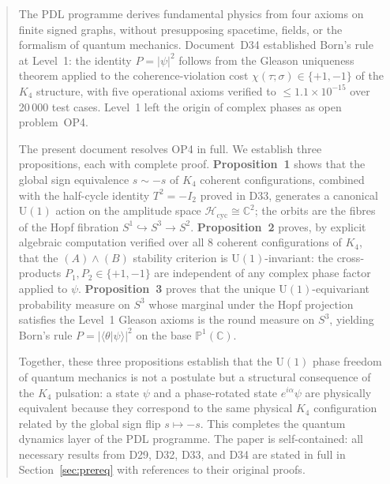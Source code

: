 \documentclass[12pt,a4paper]{article}
\newcommand{\CC}{\mathbb{C}}
\newcommand{\PP}{\mathbb{P}}
\begin{document}
\begin{abstract}
The PDL programme derives fundamental physics from four axioms on finite signed graphs,
without presupposing spacetime, fields, or the formalism of quantum mechanics.
Document~D34 established Born's rule at Level~1: the identity $P = |\psi|^2$ follows
from the Gleason uniqueness theorem applied to the coherence-violation cost $\chi(\tau;\sigma)
\in \{+1,-1\}$ of the $K_4$ structure, with five operational axioms verified to
$\leq 1.1\times10^{-15}$ over 20\,000 test cases. Level~1 left the origin of complex
phases as open problem~OP4.

The present document resolves OP4 in full. We establish three propositions, each with
complete proof. \textbf{Proposition~1} shows that the global sign equivalence
$s \sim -s$ of $K_4$ coherent configurations, combined with the half-cycle identity
$T^2 = -I_2$ proved in D33, generates a canonical $\mathrm{U}(1)$ action on the
amplitude space $\mathcal{H}_{\mathrm{cyc}} \cong \CC^2$; the orbits are the fibres of
the Hopf fibration $S^1 \hookrightarrow S^3 \to S^2$. \textbf{Proposition~2} proves,
by explicit algebraic computation verified over all 8 coherent configurations of $K_4$,
that the $(A)\wedge(B)$ stability criterion is $\mathrm{U}(1)$-invariant: the
cross-products $P_1, P_2 \in \{+1,-1\}$ are independent of any complex phase factor
applied to $\psi$. \textbf{Proposition~3} proves that the unique
$\mathrm{U}(1)$-equivariant probability measure on $S^3$ whose marginal under the Hopf
projection satisfies the Level~1 Gleason axioms is the round measure on $S^3$, yielding
Born's rule $P = |\langle\theta|\psi\rangle|^2$ on the base $\PP^1(\CC)$.

Together, these three propositions establish that the $\mathrm{U}(1)$ phase freedom of
quantum mechanics is not a postulate but a structural consequence of the $K_4$ pulsation:
a state $\psi$ and a phase-rotated state $e^{i\alpha}\psi$ are physically equivalent
because they correspond to the same physical $K_4$ configuration related by the global
sign flip $s \mapsto -s$. This completes the quantum dynamics layer of the PDL programme.
The paper is self-contained: all necessary results from D29, D32, D33, and D34 are stated
in full in Section~\ref{sec:prereq} with references to their original proofs.
\end{abstract}

\tableofcontents
\newpage

\end{document}
